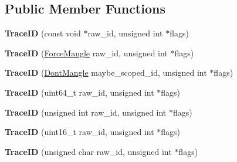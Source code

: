 \subsection*{Public Member Functions}
\begin{DoxyCompactItemize}
\item 
{\bfseries Trace\+ID} (const void $\ast$raw\+\_\+id, unsigned int $\ast$flags)\hypertarget{classv8_1_1internal_1_1tracing_1_1_trace_i_d_a58e25ff1db41a5e1fc2e1f1f8cec3d32}{}\label{classv8_1_1internal_1_1tracing_1_1_trace_i_d_a58e25ff1db41a5e1fc2e1f1f8cec3d32}

\item 
{\bfseries Trace\+ID} (\hyperlink{classv8_1_1internal_1_1tracing_1_1_trace_i_d_1_1_force_mangle}{Force\+Mangle} raw\+\_\+id, unsigned int $\ast$flags)\hypertarget{classv8_1_1internal_1_1tracing_1_1_trace_i_d_aa37c273978fee4b82eb8d5957b6e9ec5}{}\label{classv8_1_1internal_1_1tracing_1_1_trace_i_d_aa37c273978fee4b82eb8d5957b6e9ec5}

\item 
{\bfseries Trace\+ID} (\hyperlink{classv8_1_1internal_1_1tracing_1_1_trace_i_d_1_1_dont_mangle}{Dont\+Mangle} maybe\+\_\+scoped\+\_\+id, unsigned int $\ast$flags)\hypertarget{classv8_1_1internal_1_1tracing_1_1_trace_i_d_a1d0ecb7a7e9151c8f3f549fa073ac5fd}{}\label{classv8_1_1internal_1_1tracing_1_1_trace_i_d_a1d0ecb7a7e9151c8f3f549fa073ac5fd}

\item 
{\bfseries Trace\+ID} (uint64\+\_\+t raw\+\_\+id, unsigned int $\ast$flags)\hypertarget{classv8_1_1internal_1_1tracing_1_1_trace_i_d_a94f6928e09063cc7f6bb7aed30e37222}{}\label{classv8_1_1internal_1_1tracing_1_1_trace_i_d_a94f6928e09063cc7f6bb7aed30e37222}

\item 
{\bfseries Trace\+ID} (unsigned int raw\+\_\+id, unsigned int $\ast$flags)\hypertarget{classv8_1_1internal_1_1tracing_1_1_trace_i_d_a471bb959cdc7eba2bfc38fed2f3710b0}{}\label{classv8_1_1internal_1_1tracing_1_1_trace_i_d_a471bb959cdc7eba2bfc38fed2f3710b0}

\item 
{\bfseries Trace\+ID} (uint16\+\_\+t raw\+\_\+id, unsigned int $\ast$flags)\hypertarget{classv8_1_1internal_1_1tracing_1_1_trace_i_d_ac979d270831516def55ef316614ba12c}{}\label{classv8_1_1internal_1_1tracing_1_1_trace_i_d_ac979d270831516def55ef316614ba12c}

\item 
{\bfseries Trace\+ID} (unsigned char raw\+\_\+id, unsigned int $\ast$flags)\hypertarget{classv8_1_1internal_1_1tracing_1_1_trace_i_d_a89e5a55e17301cefea47323ccc24d208}{}\label{classv8_1_1internal_1_1tracing_1_1_trace_i_d_a89e5a55e17301cefea47323ccc24d208}


\end{DoxyCompactItemize}
